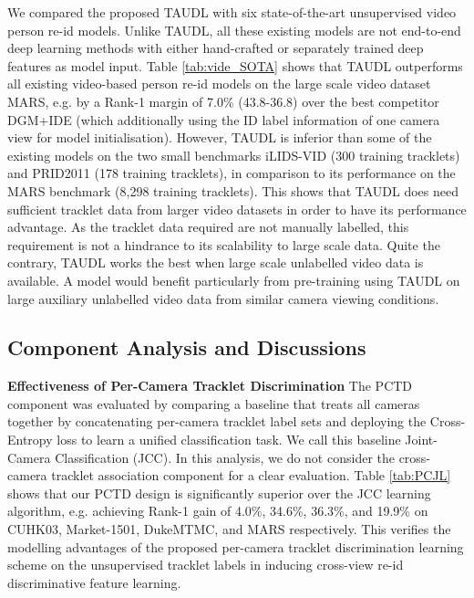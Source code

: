 \documentclass[runningheads]{llncs}
\begin{document}
We compared the proposed TAUDL with six 
state-of-the-art unsupervised video person re-id models.
Unlike TAUDL, all these existing models are not end-to-end deep learning methods
with either hand-crafted or separately trained deep features as model input.
Table \ref{tab:vide_SOTA} shows
that TAUDL outperforms all existing video-based person re-id models on
the large scale video dataset MARS,
e.g. by a Rank-1 margin of 7.0\% (43.8-36.8) over
the best competitor DGM+IDE (which additionally using the ID label information
of one camera view for model initialisation). However, TAUDL is
inferior than some of the existing models on the two small benchmarks
iLIDS-VID (300 training tracklets) and PRID2011 (178 training tracklets), 
in comparison to its performance on the MARS benchmark (8,298 training tracklets).
This shows that TAUDL does need sufficient tracklet data from larger
video datasets in order to have its performance advantage. As the
tracklet data required are not manually labelled, this requirement is not a
hindrance to its scalability to large scale data. 
Quite the contrary,
TAUDL works the best when large scale unlabelled video data is available.
A model would benefit particularly from pre-training using TAUDL on large auxiliary unlabelled video
data from similar camera viewing conditions.


\subsection{Component Analysis and Discussions}

\textbf{Effectiveness of Per-Camera Tracklet Discrimination } The PCTD component
was evaluated by comparing 
a baseline that treats all cameras together 
by concatenating per-camera tracklet label sets
and deploying the Cross-Entropy loss
to learn a unified classification task.
We call this baseline Joint-Camera Classification (JCC).
In this analysis, we do not consider the cross-camera tracklet association component
for a clear evaluation.
Table \ref{tab:PCJL} shows that 
our PCTD design is significantly superior
over the JCC learning algorithm,
e.g. achieving Rank-1 gain of 
4.0\%, 34.6\%, 36.3\%, and 19.9\% on
CUHK03, Market-1501, DukeMTMC, and MARS respectively.
This verifies the modelling advantages of the 
proposed per-camera tracklet discrimination learning scheme 
on the unsupervised tracklet labels in
inducing cross-view re-id discriminative feature learning.
\end{document}
